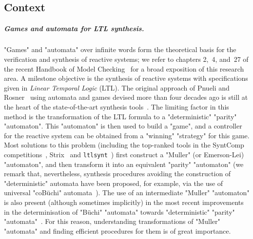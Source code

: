 \documentclass[10pt,a4paper]{amsart}
\renewcommand{\P}{\mathcal{P}}
\begin{document}
	\subsection*{Context}
\subparagraph{Games and automata for LTL synthesis.} "Games" and "automata" over infinite words form the theoretical basis for the verification and synthesis of reactive systems; we refer to chapters 2,~4, and~27 of the recent Handbook of Model Checking~\cite{PitermanPnueli2018Handbook,Kupferman2018Handbook,BloemCJ2018Handbook} for a broad exposition of this research area.
A milestone objective is the synthesis of reactive systems with specifications given in \emph{Linear Temporal Logic} (LTL).
The original approach of Pnueli and Rosner~\cite{PR89Synthesis} using automata and games devised more than four decades ago is still at the heart of the state-of-the-art synthesis tools~\cite{EKRS17FromLTLtoParity,LMS20SynthesisLTL,MichaudColange18Synt,MullerSickert17LTLtoDeterministic}.
The limiting factor in this method is the transformation of the LTL formula to a "deterministic" "parity" "automaton". This "automaton" is then used to build a "game", and a controller for the reactive system can be obtained from a "winning" "strategy" for this game.
Most solutions to this problem (including the top-ranked tools in the SyntComp competitions~\cite{SyntCompReport22}, Strix~\cite{LMS20SynthesisLTL, MS21ModernisingStrix} and \texttt{ltlsynt}~\cite{MichaudColange18Synt})  first construct a  "Muller" (or Emerson-Lei) "automaton", and then transform it into an equivalent "parity" "automaton" (we remark that, nevertheless, synthesis procedures avoiding the construction of "deterministic" automata have been proposed, for example, via the use of universal "coB\"uchi" automata~\cite{KV05Safraless}).
The use of an intermediate "Muller" "automaton" is also present (although sometimes implicitly) in the most recent improvements in the determinisation  of "B\"uchi" "automata" towards "deterministic" "parity" "automata"~\cite{LodingP19,Piterman2006fromNDBuchi,Schewe2009tighter}. For this reason, understanding transformations of "Muller" "automata" and finding efficient procedures for them is of great importance.
\end{document}
